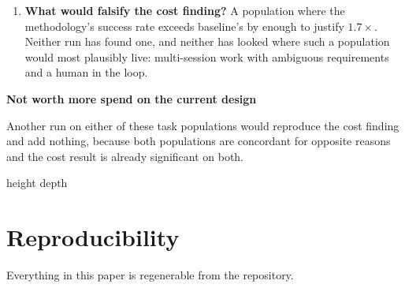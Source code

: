 \documentclass[11pt,a4paper]{article}
\newenvironment{finding}[1]
  {\par\medskip\noindent\begin{lrbox}{\findingbox}%
   \begin{minipage}{\dimexpr\linewidth-2\fboxsep-4pt}%
   \vspace{3pt}\textbf{\color{accent}#1}\par\smallskip\small}
  {\vspace{4pt}\end{minipage}\end{lrbox}%
   \noindent\textcolor{accent}{\vrule width 2pt height \dimexpr\ht\findingbox\relax depth \dimexpr\dp\findingbox\relax}%
   \colorbox{shade}{\usebox{\findingbox}}\par\medskip}
\begin{document}
\begin{enumerate}
      artefact under development, the interesting design is a within-toolkit before/after
      against a fixed baseline, not a head-to-head --- and the power problem is far cheaper to
      solve in that framing.
\item \textbf{What would falsify the cost finding?} A population where the methodology's
      success rate exceeds baseline's by enough to justify $1.7\times$. Neither run has found
      one, and neither has looked where such a population would most plausibly live:
      multi-session work with ambiguous requirements and a human in the loop.
\end{enumerate}

\begin{finding}{Not worth more spend on the current design}
Another run on either of these task populations would reproduce the cost finding and add
nothing, because both populations are concordant for opposite reasons and the cost result is
already significant on both.
\end{finding}

\section{Reproducibility}
\label{sec:repro}

Everything in this paper is regenerable from the repository.
\end{document}

